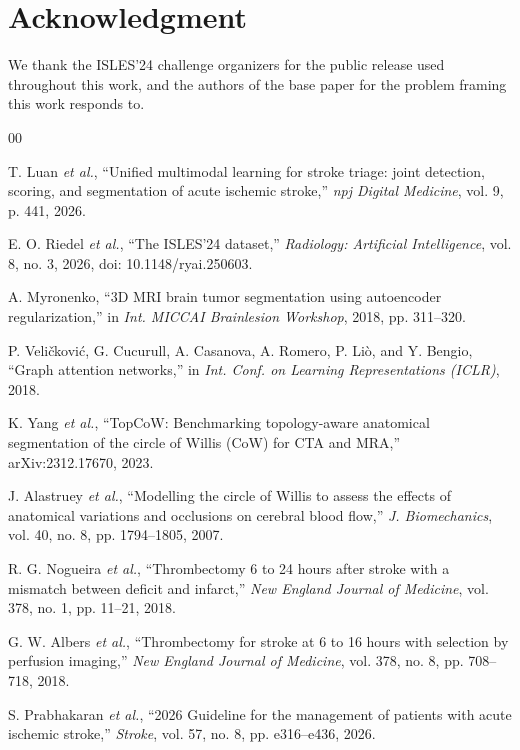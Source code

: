 \documentclass[conference]{IEEEtran}
\begin{document}
\section*{Acknowledgment}
We thank the ISLES'24 challenge organizers for the public release used throughout this work, and the authors of the base paper \cite{luan2026} for the problem framing this work responds to.

\begin{thebibliography}{00}

 T. Luan \emph{et al.}, ``Unified multimodal learning for stroke triage: joint detection, scoring, and segmentation of acute ischemic stroke,'' \emph{npj Digital Medicine}, vol. 9, p. 441, 2026.

 E. O. Riedel \emph{et al.}, ``The ISLES'24 dataset,'' \emph{Radiology: Artificial Intelligence}, vol. 8, no. 3, 2026, doi: 10.1148/ryai.250603.

 A. Myronenko, ``3D MRI brain tumor segmentation using autoencoder regularization,'' in \emph{Int. MICCAI Brainlesion Workshop}, 2018, pp. 311--320.

 P. Veli\v{c}kovi\'{c}, G. Cucurull, A. Casanova, A. Romero, P. Li\`{o}, and Y. Bengio, ``Graph attention networks,'' in \emph{Int. Conf. on Learning Representations (ICLR)}, 2018.

 K. Yang \emph{et al.}, ``TopCoW: Benchmarking topology-aware anatomical segmentation of the circle of Willis (CoW) for CTA and MRA,'' arXiv:2312.17670, 2023.

 J. Alastruey \emph{et al.}, ``Modelling the circle of Willis to assess the effects of anatomical variations and occlusions on cerebral blood flow,'' \emph{J. Biomechanics}, vol. 40, no. 8, pp. 1794--1805, 2007.

 R. G. Nogueira \emph{et al.}, ``Thrombectomy 6 to 24 hours after stroke with a mismatch between deficit and infarct,'' \emph{New England Journal of Medicine}, vol. 378, no. 1, pp. 11--21, 2018.

 G. W. Albers \emph{et al.}, ``Thrombectomy for stroke at 6 to 16 hours with selection by perfusion imaging,'' \emph{New England Journal of Medicine}, vol. 378, no. 8, pp. 708--718, 2018.

 S. Prabhakaran \emph{et al.}, ``2026 Guideline for the management of patients with acute ischemic stroke,'' \emph{Stroke}, vol. 57, no. 8, pp. e316--e436, 2026.


\end{thebibliography}
\end{document}
